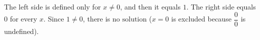 The left side is defined only for $x\ne0$, and then it equals $1$. The right side equals $0$ for every $x$. Since $1\ne0$, there is $\boxed{\text{no solution}}$ ($x=0$ is excluded because $\dfrac{0}{0}$ is undefined).
